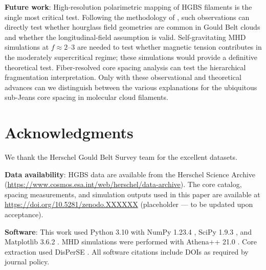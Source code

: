 \documentclass[11pt,a4paper]{article}
\begin{document}
\textbf{Future work}: High-resolution polarimetric mapping of HGBS filaments is the single most critical test. Following the methodology of \citet{Jadhav2026}, such observations can directly test whether hourglass field geometries are common in Gould Belt clouds and whether the longitudinal-field assumption is valid. Self-gravitating MHD simulations at $f \approx 2$--$3$ are needed to test whether magnetic tension contributes in the moderately supercritical regime; these simulations would provide a definitive theoretical test. Fiber-resolved core spacing analysis can test the hierarchical fragmentation interpretation. Only with these observational and theoretical advances can we distinguish between the various explanations for the ubiquitous sub-Jeans core spacing in molecular cloud filaments.

\section*{Acknowledgments}

We thank the Herschel Gould Belt Survey team for the excellent datasets.

\textbf{Data availability}: HGBS data are available from the Herschel Science Archive (\url{https://www.cosmos.esa.int/web/herschel/data-archive}). The core catalog, spacing measurements, and simulation outputs used in this paper are available at \url{https://doi.org/10.5281/zenodo.XXXXXX} (placeholder — to be updated upon acceptance).

\textbf{Software}: This work used Python 3.10 \citep{Python2023} with NumPy 1.23.4 \citep{Harris2020}, SciPy 1.9.3 \citep{Virtanen2020}, and Matplotlib 3.6.2 \citep{Hunter2007}. MHD simulations were performed with Athena++ 21.0 \citep{Stone2020}. Core extraction used DisPerSE \citep{Sousbie2011}. All software citations include DOIs as required by journal policy.



\end{document}
